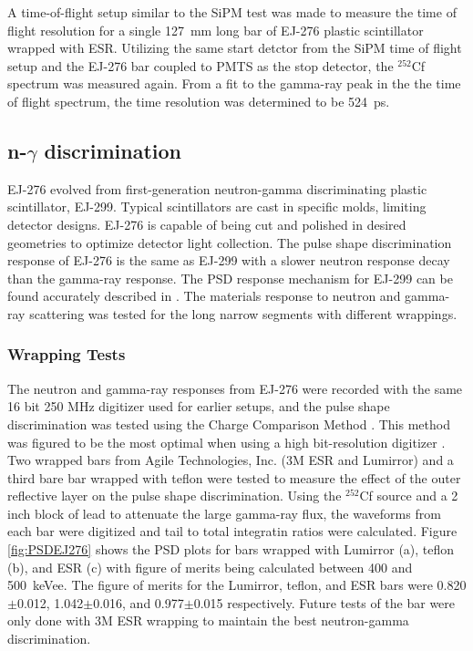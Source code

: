 A time-of-flight setup similar to the SiPM test was made to measure the time of flight resolution for a single 127~mm long bar of EJ-276 plastic scintillator wrapped with ESR. Utilizing the same start detctor from the SiPM time of flight setup and the EJ-276 bar coupled to PMTS as the stop detector, the $^{252}$Cf spectrum was measured again. From a fit to the gamma-ray peak in the the time of flight spectrum, the time resolution was determined to be 524~ps.

\subsection{n-${\mathit \gamma}$ discrimination} \label{PSDsection}
EJ-276 evolved from first-generation neutron-gamma discriminating plastic scintillator, EJ-299. Typical scintillators are cast in specific molds, limiting detector designs. EJ-276 is capable of being cut and polished in desired geometries to optimize detector light collection. The pulse shape discrimination response of EJ-276 is the same as EJ-299 with a slower neutron response decay than the gamma-ray response. The PSD response mechanism for EJ-299 can be found accurately described in \cite{Zaitseva2012}. The materials response to neutron and gamma-ray scattering was tested for the long narrow segments with different wrappings.
\subsubsection{Wrapping Tests}
 The neutron and gamma-ray responses from EJ-276 were recorded with the same 16 bit 250 MHz digitizer used for earlier setups, and the pulse shape discrimination was tested using the Charge Comparison Method \cite{CCMPSD}. This method was figured to be the most optimal when using a high bit-resolution digitizer \cite{HighResPSD}.
Two wrapped bars from Agile Technologies, Inc. (3M\textsuperscript{\texttrademark} ESR and Lumirror\textsuperscript{\texttrademark}) and a third bare bar wrapped with teflon were tested to measure the effect of the outer reflective layer on the pulse shape discrimination. Using the $^{252}$Cf source and a 2 inch block of lead to attenuate the large gamma-ray flux, the waveforms from each bar were digitized and tail to total integratin ratios were calculated. Figure \ref{fig:PSDEJ276} shows the PSD plots for bars wrapped with Lumirror\textsuperscript{\texttrademark} (a), teflon (b), and ESR (c) with figure of merits being calculated between 400 and 500~keVee. The figure of merits for the Lumirror\textsuperscript{\texttrademark}, teflon, and ESR bars were 0.820$\pm$0.012, 1.042$\pm$0.016, and 0.977$\pm$0.015 respectively. Future tests of the bar were only done with 3M\textsuperscript{\texttrademark} ESR wrapping to maintain the best neutron-gamma discrimination.

